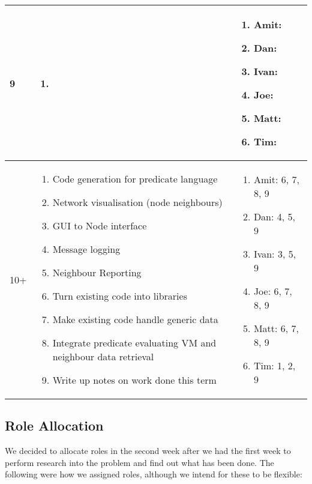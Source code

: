\begin{center}
\begin{longtable}{| l | p{7.5cm} | p{5cm} |}
	9 & \begin{enumerate}
			\item 
		\end{enumerate} &
	\begin{enumerate}
		\item[] Amit: 
		\item[] Dan: 
		\item[] Ivan: 
		\item[] Joe: 
		\item[] Matt: 
		\item[] Tim: 
	\end{enumerate}
	\\ \hline

	10+ & \begin{enumerate}
			\item Code generation for predicate language
			\item Network visualisation (node neighbours)
			\item GUI to Node interface
			\item Message logging
			\item Neighbour Reporting
			\item Turn existing code into libraries
			\item Make existing code handle generic data
			\item Integrate predicate evaluating VM and neighbour data retrieval
			\item Write up notes on work done this term
		\end{enumerate} &
	\begin{enumerate}
		\item[] Amit: 6, 7, 8, 9
		\item[] Dan: 4, 5, 9
		\item[] Ivan: 3, 5, 9
		\item[] Joe: 6, 7, 8, 9
		\item[] Matt: 6, 7, 8, 9
		\item[] Tim: 1, 2, 9
	\end{enumerate}
	\\ \hline

	\end{longtable}
\end{center}

\subsection{Role Allocation}

We decided to allocate roles in the second week after we had the first week to perform research into the problem and find out what has been done. The following were how we assigned roles, although we intend for these to be flexible:

